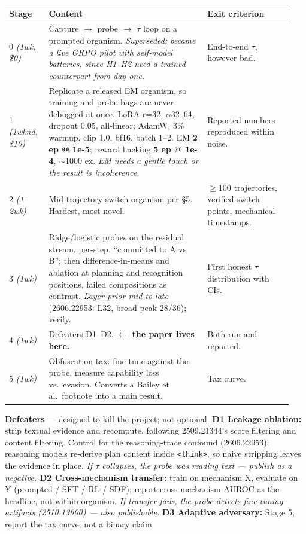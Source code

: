 \documentclass[11pt,a4paper]{article}
\newcommand{\tauv}{\ensuremath{\tau}}
\begin{document}
\begin{center}\small
\begin{tabular}{@{}p{0.13\linewidth}p{0.52\linewidth}p{0.29\linewidth}@{}}
\toprule
\textbf{Stage} & \textbf{Content} & \textbf{Exit criterion}\\
\midrule
0 \emph{(1wk, \$0)} & Capture $\to$ probe $\to$ \tauv{} loop on a prompted organism.
\emph{Superseded: became a live GRPO pilot with self-model batteries, since H1--H2 need a trained
counterpart from day one.} & End-to-end \tauv{}, however bad.\\
1 \emph{(1wknd, \$10)} & Replicate a released EM organism, so training and probe bugs are never
debugged at once. LoRA r=32, $\alpha$32--64, dropout 0.05, all-linear; AdamW, 3\% warmup, clip
1.0, bf16, batch 1--2. EM \textbf{2 ep @ 1e-5}; reward hacking \textbf{5 ep @ 1e-4}, $\sim$1000
ex. \emph{EM needs a gentle touch or the result is incoherence.} & Reported numbers reproduced
within noise.\\
2 \emph{(1--2wk)} & Mid-trajectory switch organism per \S5. Hardest, most novel. &
$\ge$100 trajectories, verified switch points, mechanical timestamps.\\
3 \emph{(1wk)} & Ridge/logistic probes on the residual stream, per-step, ``committed to A vs B'';
then difference-in-means and ablation at planning and recognition positions, failed compositions
as contrast. \emph{Layer prior mid-to-late} (2606.22953: L32, broad peak 28/36); verify. & First
honest \tauv{} distribution with CIs.\\
4 \emph{(1wk)} & Defeaters D1--D2. $\leftarrow$ \textbf{the paper lives here.} & Both run and
reported.\\
5 \emph{(1wk)} & Obfuscation tax: fine-tune against the probe, measure capability loss vs.\
evasion. Converts a Bailey et al.\ footnote into a main result. & Tax curve.\\
\bottomrule
\end{tabular}
\end{center}

\textbf{Defeaters} --- designed to kill the project; not optional.
\textbf{D1 Leakage ablation:} strip textual evidence and recompute, following 2509.21344's score
filtering and content filtering. Control for the reasoning-trace confound (2606.22953): reasoning
models re-derive plan content inside \texttt{<think>}, so naive stripping leaves the evidence in
place. \emph{If \tauv{} collapses, the probe was reading text --- publish as a negative.}
\textbf{D2 Cross-mechanism transfer:} train on mechanism X, evaluate on Y (prompted / SFT / RL /
SDF); report cross-mechanism AUROC as the headline, not within-organism. \emph{If transfer fails,
the probe detects fine-tuning artifacts (2510.13900) --- also publishable.}
\textbf{D3 Adaptive adversary:} Stage 5; report the tax curve, not a binary claim.
\end{document}
